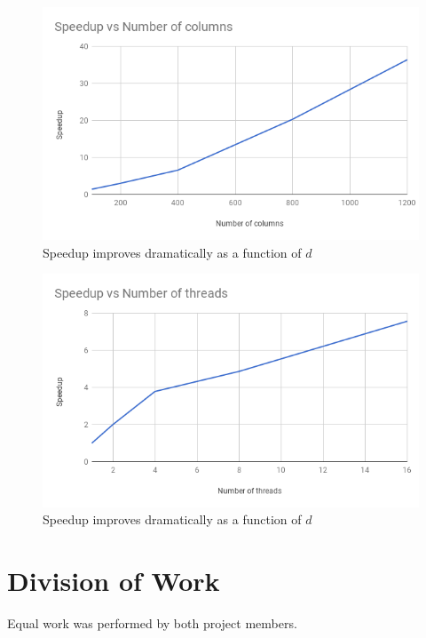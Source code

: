 \documentclass[12pt]{article}
\begin{document}
\begin{figure}[ht]
\centering
\label{speedup-vs-cols}
\includegraphics[scale=0.7]{speedup-vs-cols}
\caption{Speedup improves dramatically as a function of $d$}
\end{figure}

\begin{figure}[ht]
\centering
\label{speedup-vs-threads}
\includegraphics[scale=0.7]{speedup-vs-threads}
\caption{Speedup improves dramatically as a function of $d$}
\end{figure}

\section{Division of Work}
Equal work was performed by both project members. 

\nocite{talukdar2014scaling}
\nocite{talukdar2009new}



\end{document}
